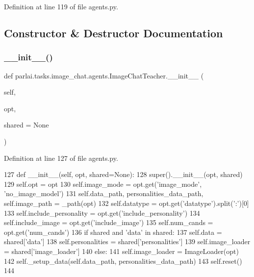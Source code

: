 Definition at line 119 of file agents.\+py.



\subsection{Constructor \& Destructor Documentation}
\mbox{\label{classparlai_1_1tasks_1_1image__chat_1_1agents_1_1ImageChatTeacher_a76afe081f47705eb7ec3a5c5c82a1761}} 
\subsubsection{\texorpdfstring{\+\_\+\+\_\+init\+\_\+\+\_\+()}{\_\_init\_\_()}}
{\footnotesize\ttfamily def parlai.\+tasks.\+image\+\_\+chat.\+agents.\+Image\+Chat\+Teacher.\+\_\+\+\_\+init\+\_\+\+\_\+ (\begin{DoxyParamCaption}\item[{}]{self,  }\item[{}]{opt,  }\item[{}]{shared = {\ttfamily None} }\end{DoxyParamCaption})}



Definition at line 127 of file agents.\+py.


\begin{DoxyCode}
127     \textcolor{keyword}{def }\_\_init\_\_(self, opt, shared=None):
128         super().\_\_init\_\_(opt, shared)
129         self.opt = opt
130         self.image\_mode = opt.get(\textcolor{stringliteral}{'image\_mode'}, \textcolor{stringliteral}{'no\_image\_model'})
131         self.data\_path, personalities\_data\_path, self.image\_path = \_path(opt)
132         self.datatype = opt.get(\textcolor{stringliteral}{'datatype'}).split(\textcolor{stringliteral}{':'})[0]
133         self.include\_personality = opt.get(\textcolor{stringliteral}{'include\_personality'})
134         self.include\_image = opt.get(\textcolor{stringliteral}{'include\_image'})
135         self.num\_cands = opt.get(\textcolor{stringliteral}{'num\_cands'})
136         \textcolor{keywordflow}{if} shared \textcolor{keywordflow}{and} \textcolor{stringliteral}{'data'} \textcolor{keywordflow}{in} shared:
137             self.data = shared[\textcolor{stringliteral}{'data'}]
138             self.personalities = shared[\textcolor{stringliteral}{'personalities'}]
139             self.image\_loader = shared[\textcolor{stringliteral}{'image\_loader'}]
140         \textcolor{keywordflow}{else}:
141             self.image\_loader = ImageLoader(opt)
142             self.\_setup\_data(self.data\_path, personalities\_data\_path)
143         self.reset()
144 
\end{DoxyCode}


